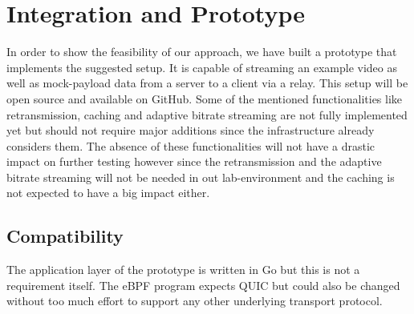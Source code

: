 \section{Integration and Prototype}\label{sec:integration_and_prototype}

In order to show the feasibility of our approach, we have built a prototype 
that implements the suggested setup.
It is capable of streaming an example video as well as mock-payload data from 
a server to a client via a relay.
This setup will be open source and available on GitHub.
Some of the mentioned functionalities like retransmission, caching and adaptive
bitrate streaming are not fully implemented yet but should not require major
additions since the infrastructure already considers them.
The absence of these functionalities will not have a drastic impact on further 
testing however since the retransmission and the adaptive bitrate streaming will not
be needed in out lab-environment and the caching is not expected to have a big impact
either.

\subsection{Compatibility}
The application layer of the prototype is written in Go but this is not a requirement
itself.
The eBPF program expects QUIC but could also be changed without too much effort to
support any other underlying transport protocol.

